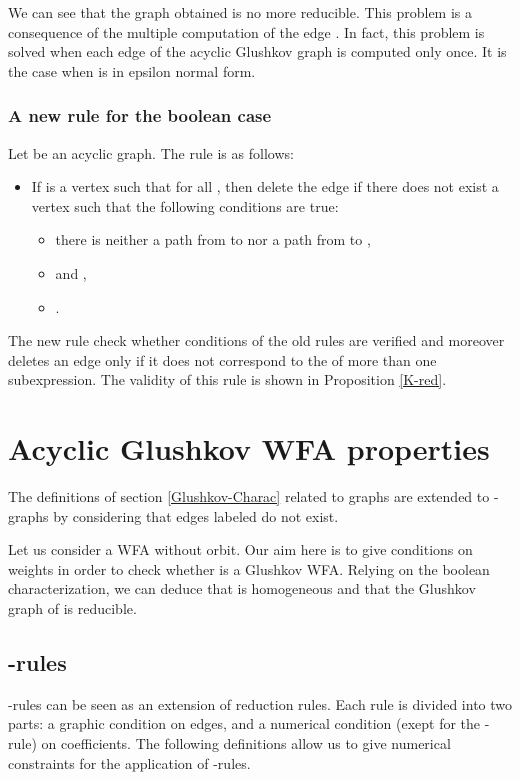 \documentclass[11pt]{article}
\begin{document}
We can see that the graph obtained is no more reducible. This problem is a consequence of the multiple computation of the edge . In fact, this problem is solved when each edge of the acyclic Glushkov graph is computed only once. It is the case when  is in epsilon normal form.

\subsubsection*{A new  rule for the boolean case}
Let  be an acyclic graph. The rule   is as follows:\\
\begin{itemize}
\item If  is a vertex such that for all , then delete the edge  if there does not exist a vertex  such that the following conditions are true:
\begin{itemize}
\item there is neither a path from  to  nor a path  from    to ,
\item  and ,
\item .
\end{itemize}
\end{itemize}
The new rule  check whether conditions of the old  rules are verified and moreover deletes an edge only if it does not correspond to the  of more than one subexpression.
The validity of this rule is shown in Proposition \ref{K-red}.


 
\section{Acyclic Glushkov WFA properties}
The definitions of section \ref{Glushkov-Charac} related to graphs are extended to -graphs by considering that edges labeled  do not exist.

Let us consider  a WFA without orbit.
Our aim here is to give conditions on weights in order to check whether  is a Glushkov WFA. 
Relying on the boolean characterization, we can deduce that  is homogeneous and that the Glushkov graph of  is reducible.


\subsection{-rules}
  
    
-rules can be seen as an extension of reduction rules. Each rule is divided into two parts: a graphic condition on edges, and a numerical condition (exept for the -rule) on coefficients.
The following definitions allow us to give numerical constraints for the application of -rules.
\end{document}
